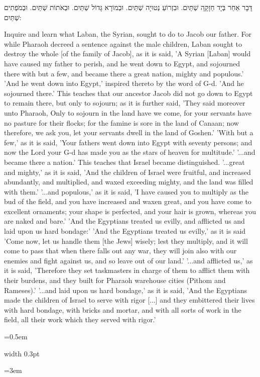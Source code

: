 \documentclass[11pt, openany]{book}
\newlength{\bidiHebWidth}
\newlength{\bidiEngWidth}
\newenvironment{bilingual}{%
  \par\vspace{4pt}%
}{%
  \noindent
  \begin{minipage}[t]{\bidiEngWidth}
    \setstretch{1.4}\emergencystretch=0.5em\normalsize
    \usebox{\bidiEngBox}
  \end{minipage}%
  \hfill
  {\color{sedergold}\vrule width 0.3pt}%
  \hfill
  \begin{minipage}[t]{\bidiHebWidth}
    \begingroup\hebrewfont\TeXXeTstate=1\beginR
    \large\setstretch{1.4}\emergencystretch=3em\tolerance=9999\parindent=0pt\relax
    \usebox{\bidiHebBox}
    \endR\endgroup
  \end{minipage}%
  \par\vspace{2pt}%
}
\newenvironment{hebrewcol}{%
  \begin{lrbox}{\bidiHebBox}\begin{minipage}{\bidiHebWidth}%
}{%
  \end{minipage}\end{lrbox}%
}
\newenvironment{englishcol}{%
  \begin{lrbox}{\bidiEngBox}\begin{minipage}{\bidiEngWidth}%
}{%
  \end{minipage}\end{lrbox}%
}
\begin{document}
\begin{bilingual}
\begin{hebrewcol}
דָּבָר אַחֵר בְּיָד חַזָקָָה שְׁתַּיִם. וּבִזְרוֹעַ נְטוּיָה שְׁתַּיִם. וּבְמוֹרָא גָּדוֹל שְׁתַּיִם. וּבְאֹתוֹת שְׁתַּיִם. וּבְמֹפְתִים שְׁתַּיִם:
\end{hebrewcol}
\begin{englishcol}
Inquire and learn what Laban, the Syrian, sought to do to Jacob our father. For while Pharaoh decreed a sentence against the male children, Laban sought to destroy the whole [of the family of Jacob], as it is said, 'A Syrian [Laban] would have caused my father to perish, and he went down to Egypt, and sojourned there with but a few, and became there a great nation, mighty and populous.'
'And he went down into Egypt,' inspired thereto by the word of G-d. 'And he sojourned there.' This teaches that our ancestor Jacob did not go down to Egypt to remain there, but only to sojourn; as it is further said, 'They said moreover unto Pharaoh, Only to sojourn in the land have we come, for your servants have no pasture for their flocks; for the famine is sore in the land of Canaan; now therefore, we ask you, let your servants dwell in the land of Goshen.'
'With but a few,' as it is said, 'Your fathers went down into Egypt with seventy persons; and now the Lord your G-d has made you as the stars of heaven for multitude.'
'...and became there a nation.' This teaches that Israel became distinguished. '...great and mighty,' as it is said, 'And the children of Israel were fruitful, and increased abundantly, and multiplied, and waxed exceeding mighty, and the land was filled with them.' '...and populous,' as it is said, 'I have caused you to multiply as the bud of the field, and you have increased and waxen great, and you have come to excellent ornaments; your shape is perfected, and your hair is grown, whereas you are naked and bare.'
'And the Egyptians treated us evilly, and  afflicted us and laid upon us hard bondage:' 'And the Egyptians treated us evilly,' as it is said 'Come now, let us handle them [the Jews] wisely; lest they multiply, and it will come to pass that when there falls out any war, they will join also with our enemies and fight against us, and so leave out of our land.' '...and afflicted us,' as it is said, 'Therefore they set taskmasters in charge of them to afflict them with their burdens,  and they built for Pharaoh warehouse cities (Pithom and Rameses).' '...and laid upon us hard bondage,' as it is said, 'And the Egyptians made the children of Israel to serve with rigor [...] and they embittered their lives with hard bondage, with bricks and mortar, and with all sorts of work in the field, all their work which they served with rigor.'

\end{englishcol}
\end{bilingual}
\end{document}
